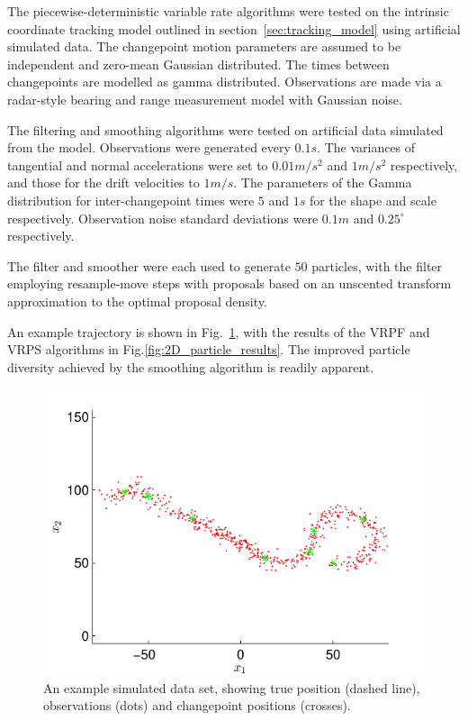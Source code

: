 \documentclass[peerreview,11pt,draftcls,onecolumn]{IEEEtran}
\begin{document}
The piecewise-deterministic variable rate algorithms were tested on the intrinsic coordinate tracking model outlined in section~\ref{sec:tracking_model} using artificial simulated data. The changepoint motion parameters are assumed to be independent and zero-mean Gaussian distributed. The times between changepoints are modelled as gamma distributed. Observations are made via a radar-style bearing and range measurement model with Gaussian noise.

The filtering and smoothing algorithms were tested on artificial data simulated from the model. Observations were generated every $0.1s$. The variances of tangential and normal accelerations were set to $0.01m/s^2$ and $1m/s^2$ respectively, and those for the drift velocities to $1m/s$. The parameters of the Gamma distribution for inter-changepoint times were $5$ and $1s$ for the shape and scale respectively. Observation noise standard deviations were $0.1m$ and $0.25^{\circ}$ respectively.

The filter and smoother were each used to generate $50$ particles, with the filter employing resample-move steps with proposals based on an unscented transform \cite{Julier2004} approximation to the optimal proposal density.

An example trajectory is shown in Fig.~\ref{fig:simulated_trajectory}, with the results of the VRPF and VRPS algorithms in Fig.\ref{fig:2D_particle_results}. The improved particle diversity achieved by the smoothing algorithm is readily apparent.

\begin{figure}[!t]
\centering
\includegraphics[width=0.45\columnwidth]{simulated_problem.pdf}
\caption{An example simulated data set, showing true position (dashed line), observations (dots) and changepoint positions (crosses). }
\label{fig:simulated_trajectory}
\end{figure}
\end{document}

